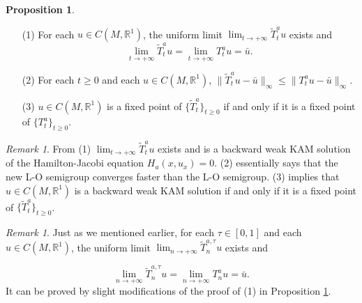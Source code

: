 \documentclass{amsart}[12pt]
\theoremstyle{definition}
\newtheorem{proposition}[theorem]{Proposition}
\theoremstyle{remark}
\newtheorem{remark}[theorem]{Remark}
\numberwithin{equation}{section}
\begin{document}
\begin{proposition}\label{pr4-3}
\noindent
\begin{itemize}
    \item [(1)] For each $u\in C(M,\mathbb{R}^1)$, the uniform limit
              $\lim_{t\rightarrow+\infty}\tilde{T}^a_tu$ exists and
              \[
              \lim_{t\rightarrow+\infty}\tilde{T}^a_tu=\lim_{t\rightarrow+\infty}T^a_tu=\bar{u}.
              \]
    \item [(2)] For each $t\geq 0$ and each $u\in C(M,\mathbb{R}^1)$,
              $\|\tilde{T}^a_tu-\bar{u}\|_\infty\leq\|T^a_tu-\bar{u}\|_\infty.$
    \item [(3)] $u\in C(M,\mathbb{R}^1)$ is a fixed point of $\{\tilde{T}^a_t\}_{t\geq
              0}$ if and only if it is a fixed point of $\{T^a_t\}_{t\geq0}.$
\end{itemize}
\end{proposition}

\begin{remark}
From (1) $\lim_{t\rightarrow+\infty}\tilde{T}^a_tu$ exists and is
a backward weak KAM solution of the Hamilton-Jacobi equation
$H_a(x,u_x)=0$. (2) essentially says that the new L-O semigroup
converges faster than the L-O semigroup. (3) implies that $u\in
C(M,\mathbb{R}^1)$ is a backward weak KAM solution if and only if
it is a fixed point of $\{\tilde{T}^a_t\}_{t\geq 0}$.
\end{remark}

\begin{remark}\label{re4-1}
Just as we mentioned earlier, for each $\tau\in[0,1]$ and each $u\in
C(M,\mathbb{R}^1)$, the uniform limit
$\lim_{n\to+\infty}\tilde{T}_n^{a,\tau}u$ exists and

\[
\lim_{n\to+\infty}\tilde{T}_n^{a,\tau}u=\lim_{n\to+\infty}T_n^au=\bar{u}.
\]
It can be proved by slight modifications of the proof of (1)
in Proposition \ref{pr4-3}.
\end{remark}
\end{document}
